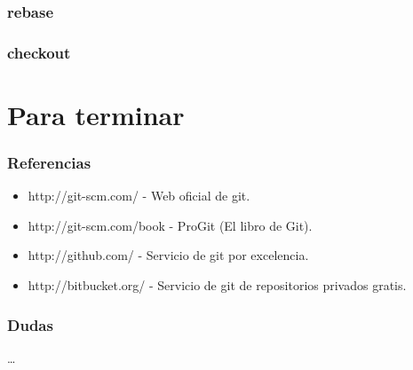 \documentclass[10pt]{beamer}
\begin{document}
  \begin{frame}
    \frametitle{rebase}
  \end{frame}

  \begin{frame}
    \frametitle{checkout}
  \end{frame}

  \section*{Para terminar}

  \begin{frame}
    \frametitle{Referencias}
    \begin{itemize}
      \item \small{http://git-scm.com/ - Web oficial de git.}
      \item \small{http://git-scm.com/book - ProGit (El libro de Git).}
      \item \small{http://github.com/ - Servicio de git por excelencia.}
      \item \small{http://bitbucket.org/ - Servicio de git de repositorios privados gratis.}
    \end{itemize}
  \end{frame}

  \begin{frame}
    \frametitle{Dudas}
    \dots
  \end{frame}
\end{document}
